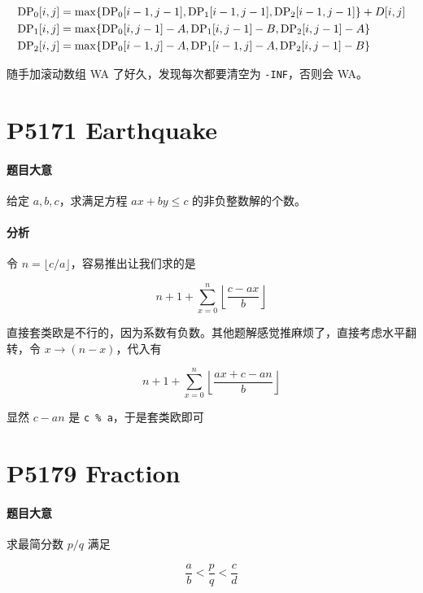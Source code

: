 \[ \begin{aligned}
{\rm DP}_0[i, j] &= \max\{ {\rm DP}_0[i - 1, j - 1], {\rm DP}_1[i - 1, j - 1], {\rm DP}_2[i - 1, j - 1] \} + D[i, j] \\
{\rm DP}_1[i, j] &= \max\{ {\rm DP}_0[i, j - 1] - A, {\rm DP}_1[i, j - 1]- B, {\rm DP}_2[i, j - 1] - A\} \\
{\rm DP}_2[i, j] &= \max\{ {\rm DP}_0[i - 1, j] - A, {\rm DP}_1[i - 1, j] - A, {\rm DP}_2[i, j - 1] - B \} \\
\end{aligned} \]

随手加滚动数组 WA 了好久，发现每次都要清空为 \verb`-INF`，否则会 WA。

\section{P5171 Earthquake}

\paragraph{题目大意}

给定 $a,b,c$，求满足方程 $ax + by \leqslant c$ 的非负整数解的个数。

\paragraph{分析}

令 $n = \lfloor c / a \rfloor$，容易推出让我们求的是


\[ n + 1 + \sum_{x = 0}^{n} \left\lfloor \frac{c - ax}{b} \right\rfloor \]

直接套类欧是不行的，因为系数有负数。其他题解感觉推麻烦了，直接考虑水平翻转，令 $x \to (n -  x)$，代入有

\[ n + 1 + \sum_{x = 0}^{n} \left\lfloor \frac{ax + c - an}{b} \right\rfloor \]

显然 $c - an$ 是 \verb`c % a`，于是套类欧即可

\section{P5179 Fraction}

\paragraph{题目大意}

求最简分数 $p/q$ 满足

\[ \frac{a}{b} < \frac{p}{q} < \frac{c}{d} \]

